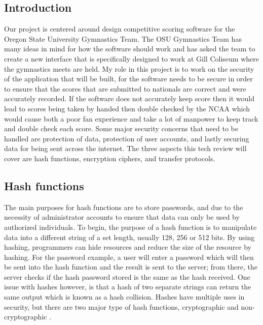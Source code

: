 \documentclass[a4paper, 10pt, draftclsnofoot, onecolumn]{article}
\begin{document}
\begin{center}
\section*{Introduction}
\end{center}
Our project is centered around design competitive scoring software for the Oregon State University Gymnastics Team. The OSU Gymnastics Team has many ideas in mind for how the software should work and has asked the team to create a new interface that is specifically designed to work at Gill Coliseum where the gymnastics meets are held. My role in this project is to work on the security of the application that will be built, for the software needs to be secure in order to ensure that the scores that are submitted to nationals are correct and were accurately recorded. If the software does not accurately keep score then it would lead to scores being taken by handed then double checked by the NCAA which would cause both a poor fan experience and take a lot of manpower to keep track and double check each score. Some major security concerns that need to be handled are protection of data, protection of user accounts, and lastly securing data for being sent across the internet. The three aspects this tech review will cover are hash functions, encryption ciphers, and transfer protocols.\\

\begin{center}
\section*{Hash functions}
\end{center}
The main purposes for hash functions are to store passwords, and due to the necessity of administrator accounts to ensure that data can only be used by authorized individuals. To begin, the purpose of a hash function is to manipulate data into a different string of a set length, usually 128, 256 or 512 bits. By using hashing, programmers can hide resources and reduce the size of the resource by hashing. For the password example, a user will enter a password which will then be sent into the hash function and the result is sent to the server; from there, the server checks if the hash password stored is the same as the hash received. One issue with hashes however, is that a hash of two separate strings can return the same output which is known as a hash collision. Hashes have multiple uses in security, but there are two major type of hash functions, cryptographic and non-cryptographic \cite{hashes}. \\
\end{document}
